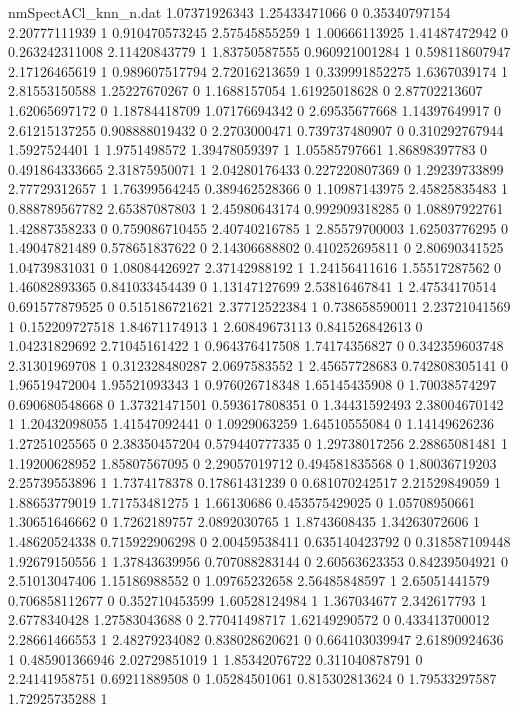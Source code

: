 \begin{filecontents}{nmSpectACl_knn_n.dat}
1.07371926343 1.25433471066 0
0.35340797154 2.20777111939 1
0.910470573245 2.57545855259 1
1.00666113925 1.41487472942 0
0.263242311008 2.11420843779 1
1.83750587555 0.960921001284 1
0.598118607947 2.17126465619 1
0.989607517794 2.72016213659 1
0.339991852275 1.6367039174 1
2.81553150588 1.25227670267 0
1.1688157054 1.61925018628 0
2.87702213607 1.62065697172 0
1.18784418709 1.07176694342 0
2.69535677668 1.14397649917 0
2.61215137255 0.908888019432 0
2.2703000471 0.739737480907 0
0.310292767944 1.5927524401 1
1.9751498572 1.39478059397 1
1.05585797661 1.86898397783 0
0.491864333665 2.31875950071 1
2.04280176433 0.227220807369 0
1.29239733899 2.77729312657 1
1.76399564245 0.389462528366 0
1.10987143975 2.45825835483 1
0.888789567782 2.65387087803 1
2.45980643174 0.992909318285 0
1.08897922761 1.42887358233 0
0.759086710455 2.40740216785 1
2.85579700003 1.62503776295 0
1.49047821489 0.578651837622 0
2.14306688802 0.410252695811 0
2.80690341525 1.04739831031 0
1.08084426927 2.37142988192 1
1.24156411616 1.55517287562 0
1.46082893365 0.841033454439 0
1.13147127699 2.53816467841 1
2.47534170514 0.691577879525 0
0.515186721621 2.37712522384 1
0.738658590011 2.23721041569 1
0.152209727518 1.84671174913 1
2.60849673113 0.841526842613 0
1.04231829692 2.71045161422 1
0.964376417508 1.74174356827 0
0.342359603748 2.31301969708 1
0.312328480287 2.0697583552 1
2.45657728683 0.742808305141 0
1.96519472004 1.95521093343 1
0.976026718348 1.65145435908 0
1.70038574297 0.690680548668 0
1.37321471501 0.593617808351 0
1.34431592493 2.38004670142 1
1.20432098055 1.41547092441 0
1.0929063259 1.64510555084 0
1.14149626236 1.27251025565 0
2.38350457204 0.579440777335 0
1.29738017256 2.28865081481 1
1.19200628952 1.85807567095 0
2.29057019712 0.494581835568 0
1.80036719203 2.25739553896 1
1.7374178378 0.17861431239 0
0.681070242517 2.21529849059 1
1.88653779019 1.71753481275 1
1.66130686 0.453575429025 0
1.05708950661 1.30651646662 0
1.7262189757 2.0892030765 1
1.8743608435 1.34263072606 1
1.48620524338 0.715922906298 0
2.00459538411 0.635140423792 0
0.318587109448 1.92679150556 1
1.37843639956 0.707088283144 0
2.60563623353 0.84239504921 0
2.51013047406 1.15186988552 0
1.09765232658 2.56485848597 1
2.65051441579 0.706858112677 0
0.352710453599 1.60528124984 1
1.367034677 2.342617793 1
2.6778340428 1.27583043688 0
2.77041498717 1.62149290572 0
0.433413700012 2.28661466553 1
2.48279234082 0.838028620621 0
0.664103039947 2.61890924636 1
0.485901366946 2.02729851019 1
1.85342076722 0.311040878791 0
2.24141958751 0.69211889508 0
1.05284501061 0.815302813624 0
1.79533297587 1.72925735288 1

\end{filecontents}
